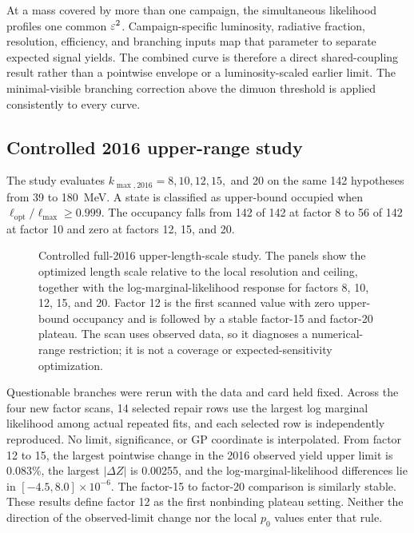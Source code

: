 At a mass covered by more than one campaign, the simultaneous likelihood profiles
one common $\varepsilon^2$. Campaign-specific luminosity, radiative fraction, resolution,
efficiency, and branching inputs map that parameter to separate expected signal
yields. The combined curve is therefore a direct shared-coupling result rather
than a pointwise envelope or a luminosity-scaled earlier limit. The
minimal-visible branching correction above the dimuon threshold is applied
consistently to every curve.

\subsection{Controlled 2016 upper-range study}
\label{sec:results-v4p1-lsupper-study}
\label{sec:results-v4-support-audit}

The study evaluates $k_{\max,2016}=8,10,12,15,$ and 20 on the same 142 hypotheses
from 39 to 180~MeV. A state is classified as upper-bound occupied when
$\ell_{\mathrm{opt}}/\ell_{\max}\geq0.999$. The occupancy falls from 142 of 142 at
factor 8 to 56 of 142 at factor 10 and zero at factors 12, 15, and 20.

\begin{figure}[H]
\centering
{}
\caption{Controlled full-2016 upper-length-scale study. The panels show the
optimized length scale relative to the local resolution and ceiling, together with
the log-marginal-likelihood response for factors 8, 10, 12, 15, and 20. Factor 12
is the first scanned value with zero upper-bound occupancy and is followed by a
stable factor-15 and factor-20 plateau. The scan uses observed data, so it
diagnoses a numerical-range restriction; it is not a coverage or
expected-sensitivity optimization.}
\label{fig:results-v4p1-lsupper-study}
\end{figure}

Questionable branches were rerun with the data and card held fixed. Across the four
new factor scans, 14 selected repair rows use the largest log marginal likelihood
among actual repeated fits, and each selected row is independently reproduced. No
limit, significance, or GP coordinate is interpolated. From factor 12 to 15, the
largest pointwise change in the 2016 observed yield upper limit is 0.083\%, the
largest $|\Delta Z|$ is 0.00255, and the log-marginal-likelihood differences lie in
$[-4.5,8.0]\times10^{-6}$. The factor-15 to factor-20 comparison is similarly
stable. These results define factor 12 as the first nonbinding plateau setting.
Neither the direction of the observed-limit change nor the local $p_0$ values
enter that rule.

